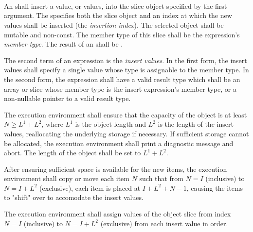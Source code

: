 \begin{grammar}
 \\
	  \terminal{(}  \terminal{,}  \terminal{)} \\
	  \terminal{(}  \terminal{,}   \terminal{)} \\
\end{grammar}


\specsubsubitem
An  shall insert a value, or values, into the
slice object specified by the first argument. The
 specifies both the slice object and an index
at which the new values shall be inserted (the \textit{insertion index}).
The selected object shall be mutable and non-const. The member type of this
slice shall be the expression's \textit{member type}. The result of an
 shall be .

\specsubsubitem
The second term of an  expression is the \textit{insert
values}. In the first form, the insert values shall specify a single value
whose type is assignable to the member type. In the second form, the expression
shall have a valid result type which shall be an array or slice whose member
type is the insert expression's member type, or a non-nullable pointer to a
valid result type.

\specsubsubitem
The execution environment shall ensure that the capacity of the object is at
least $N \geq L^1 + L^2$, where $L^1$ is the object length and $L^2$ is the
length of the insert values, reallocating the underlying storage if necessary.
If sufficient storage cannot be allocated, the execution environment shall
print a diagnostic message and abort. The length of the object shall be set to
$L^1 + L^2$.

\specsubsubitem
After ensuring sufficient space is available for the new items, the execution
environment shall copy or move each item $N$ such that from $N=I$ (inclusive)
to $N=I+L^2$ (exclusive), each item is placed at $I+L^2+N-1$, causing the items
to "shift" over to accomodate the insert values.

\specsubsubitem
The execution environment shall assign values of the object slice from index
$N = I$ (inclusive) to $N = I+L^2$ (exclusive) from each insert value in order.

